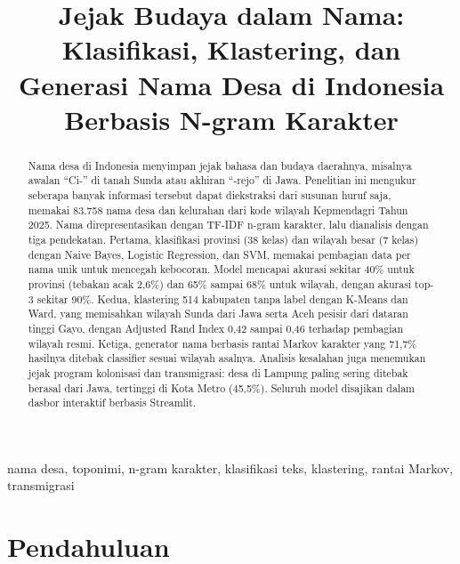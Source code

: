 \documentclass[conference]{IEEEtran}
\begin{document}
\title{Jejak Budaya dalam Nama: Klasifikasi, Klastering, dan Generasi Nama Desa di Indonesia Berbasis N-gram Karakter}

\author{
}

\maketitle

\begin{abstract}
Nama desa di Indonesia menyimpan jejak bahasa dan budaya daerahnya, misalnya awalan ``Ci-'' di tanah Sunda atau akhiran ``-rejo'' di Jawa. Penelitian ini mengukur seberapa banyak informasi tersebut dapat diekstraksi dari susunan huruf saja, memakai 83.758 nama desa dan kelurahan dari kode wilayah Kepmendagri Tahun 2025. Nama direpresentasikan dengan TF-IDF n-gram karakter, lalu dianalisis dengan tiga pendekatan. Pertama, klasifikasi provinsi (38 kelas) dan wilayah besar (7 kelas) dengan Naive Bayes, Logistic Regression, dan SVM, memakai pembagian data per nama unik untuk mencegah kebocoran. Model mencapai akurasi sekitar 40\% untuk provinsi (tebakan acak 2,6\%) dan 65\% sampai 68\% untuk wilayah, dengan akurasi top-3 sekitar 90\%. Kedua, klastering 514 kabupaten tanpa label dengan K-Means dan Ward, yang memisahkan wilayah Sunda dari Jawa serta Aceh pesisir dari dataran tinggi Gayo, dengan Adjusted Rand Index 0,42 sampai 0,46 terhadap pembagian wilayah resmi. Ketiga, generator nama berbasis rantai Markov karakter yang 71,7\% hasilnya ditebak classifier sesuai wilayah asalnya. Analisis kesalahan juga menemukan jejak program kolonisasi dan transmigrasi: desa di Lampung paling sering ditebak berasal dari Jawa, tertinggi di Kota Metro (45,5\%). Seluruh model disajikan dalam dasbor interaktif berbasis Streamlit.
\end{abstract}

\begin{IEEEkeywords}
nama desa, toponimi, n-gram karakter, klasifikasi teks, klastering, rantai Markov, transmigrasi
\end{IEEEkeywords}

\section{Pendahuluan}
\end{document}
